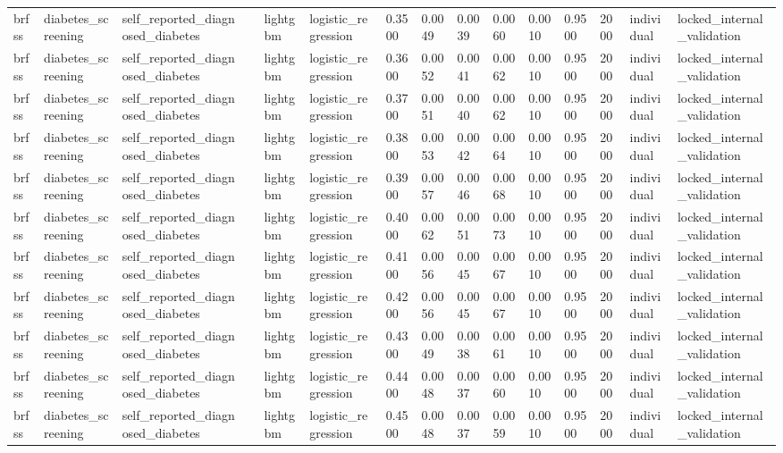 \begin{tabular}{lllllllllllllll}
brfss & diabetes\_screening & self\_reported\_diagnosed\_diabetes &  & lightgbm & logistic\_regression & 0.3500 & 0.0049 & 0.0039 & 0.0060 & 0.0010 & 0.9500 & 2000 & individual & locked\_internal\_validation \\
brfss & diabetes\_screening & self\_reported\_diagnosed\_diabetes &  & lightgbm & logistic\_regression & 0.3600 & 0.0052 & 0.0041 & 0.0062 & 0.0010 & 0.9500 & 2000 & individual & locked\_internal\_validation \\
brfss & diabetes\_screening & self\_reported\_diagnosed\_diabetes &  & lightgbm & logistic\_regression & 0.3700 & 0.0051 & 0.0040 & 0.0062 & 0.0010 & 0.9500 & 2000 & individual & locked\_internal\_validation \\
brfss & diabetes\_screening & self\_reported\_diagnosed\_diabetes &  & lightgbm & logistic\_regression & 0.3800 & 0.0053 & 0.0042 & 0.0064 & 0.0010 & 0.9500 & 2000 & individual & locked\_internal\_validation \\
brfss & diabetes\_screening & self\_reported\_diagnosed\_diabetes &  & lightgbm & logistic\_regression & 0.3900 & 0.0057 & 0.0046 & 0.0068 & 0.0010 & 0.9500 & 2000 & individual & locked\_internal\_validation \\
brfss & diabetes\_screening & self\_reported\_diagnosed\_diabetes &  & lightgbm & logistic\_regression & 0.4000 & 0.0062 & 0.0051 & 0.0073 & 0.0010 & 0.9500 & 2000 & individual & locked\_internal\_validation \\
brfss & diabetes\_screening & self\_reported\_diagnosed\_diabetes &  & lightgbm & logistic\_regression & 0.4100 & 0.0056 & 0.0045 & 0.0067 & 0.0010 & 0.9500 & 2000 & individual & locked\_internal\_validation \\
brfss & diabetes\_screening & self\_reported\_diagnosed\_diabetes &  & lightgbm & logistic\_regression & 0.4200 & 0.0056 & 0.0045 & 0.0067 & 0.0010 & 0.9500 & 2000 & individual & locked\_internal\_validation \\
brfss & diabetes\_screening & self\_reported\_diagnosed\_diabetes &  & lightgbm & logistic\_regression & 0.4300 & 0.0049 & 0.0038 & 0.0061 & 0.0010 & 0.9500 & 2000 & individual & locked\_internal\_validation \\
brfss & diabetes\_screening & self\_reported\_diagnosed\_diabetes &  & lightgbm & logistic\_regression & 0.4400 & 0.0048 & 0.0037 & 0.0060 & 0.0010 & 0.9500 & 2000 & individual & locked\_internal\_validation \\
brfss & diabetes\_screening & self\_reported\_diagnosed\_diabetes &  & lightgbm & logistic\_regression & 0.4500 & 0.0048 & 0.0037 & 0.0059 & 0.0010 & 0.9500 & 2000 & individual & locked\_internal\_validation \\

\end{tabular}
